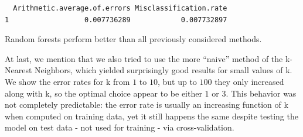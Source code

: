 \documentclass[
  letterpaper,
  DIV=11,
  numbers=noendperiod]{scrartcl}
\begin{document}
\begin{verbatim}
  Arithmetic.average.of.errors Misclassification.rate
1                  0.007736289            0.007732897
\end{verbatim}

Random forests perform better than all previously considered methods.

At last, we mention that we also tried to use the more ``naive'' method
of the k-Nearest Neighbors, which yielded surprisingly good results for
small values of k. We show the error rates for k from \(1\) to \(10\),
but up to \(100\) they only increased along with k, so the optimal
choice appear to be either \(1\) or \(3\). This behavior was not
completely predictable: the error rate is usually an increasing function
of k when computed on training data, yet it still happens the same
despite testing the model on test data - not used for training - via
cross-validation.
\end{document}
